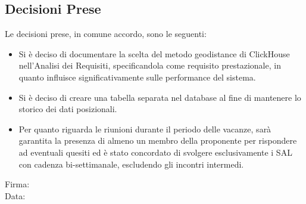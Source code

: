 \documentclass[10pt]{article}
\begin{document}
\subsection{Decisioni Prese}
Le decisioni prese, in comune accordo, sono le seguenti:
\begin{itemize}
    \item Si è deciso di documentare la scelta del metodo geodistance di ClickHouse nell'Analisi dei Requisiti, specificandola come requisito prestazionale, in quanto influisce significativamente sulle performance del sistema.
    \item Si è deciso di creare una tabella separata nel database al fine di mantenere lo storico dei dati posizionali.
    \item Per quanto riguarda le riunioni durante il periodo delle vacanze, sarà garantita la presenza di almeno un membro della proponente per rispondere ad eventuali quesiti ed è stato concordato di svolgere esclusivamente i SAL con cadenza bi-settimanale, escludendo gli incontri intermedi.
\end{itemize}


\vfill
\begin{minipage}{10cm}
Firma: \hrulefill \\
\vspace{2mm}
Data: \dotfill
\end{minipage}
\end{document}
